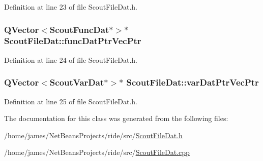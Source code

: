 Definition at line 23 of file Scout\-File\-Dat.\-h.

\hypertarget{class_scout_file_dat_a644c1c18aa490f37e4921a942daabfe3}{
\subsubsection[{func\-Dat\-Ptr\-Vec\-Ptr}]{\setlength{\rightskip}{0pt plus 5cm}Q\-Vector$<${\bf Scout\-Func\-Dat}$\ast$$>$$\ast$ Scout\-File\-Dat\-::func\-Dat\-Ptr\-Vec\-Ptr\hspace{0.3cm}{\ttfamily [private]}}}\label{class_scout_file_dat_a644c1c18aa490f37e4921a942daabfe3}


Definition at line 24 of file Scout\-File\-Dat.\-h.

\hypertarget{class_scout_file_dat_af97f5079999e27f0fcb8ff34e168b656}{
\subsubsection[{var\-Dat\-Ptr\-Vec\-Ptr}]{\setlength{\rightskip}{0pt plus 5cm}Q\-Vector$<${\bf Scout\-Var\-Dat}$\ast$$>$$\ast$ Scout\-File\-Dat\-::var\-Dat\-Ptr\-Vec\-Ptr\hspace{0.3cm}{\ttfamily [private]}}}\label{class_scout_file_dat_af97f5079999e27f0fcb8ff34e168b656}


Definition at line 25 of file Scout\-File\-Dat.\-h.



The documentation for this class was generated from the following files\-:\begin{DoxyCompactItemize}
\item 
/home/james/\-Net\-Beans\-Projects/ride/src/\hyperlink{_scout_file_dat_8h}{Scout\-File\-Dat.\-h}\item 
/home/james/\-Net\-Beans\-Projects/ride/src/\hyperlink{_scout_file_dat_8cpp}{Scout\-File\-Dat.\-cpp}\end{DoxyCompactItemize}
